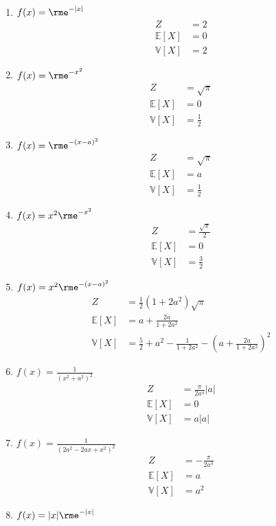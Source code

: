 \documentclass[11pt,answers]{exam}
\begin{document}
\begin{questions}
\begin{solution}
\begin{align*}
\end{align*}
\begin{enumerate}
\item $f(x)=\rme^{-|x|}$
\begin{align*}
Z&=2
\\
\mathbb{E}[X]&=0
\\
\mathbb{V}[X]&=2
\end{align*}
\item $f(x)=\rme^{-x^2}$
\begin{align*}
Z&=\sqrt{\pi}
\\
\mathbb{E}[X]&=0
\\
\mathbb{V}[X]&=\frac{1}{2}
\end{align*}
\item $f(x)=\rme^{-(x-a)^2}$
\begin{align*}
Z&=\sqrt{\pi}
\\
\mathbb{E}[X]&=a
\\
\mathbb{V}[X]&=\frac{1}{2}
\end{align*}
\item $f(x)=x^2\rme^{-x^2}$
\begin{align*}
Z&=\frac{\sqrt{\pi}}{2}
\\
\mathbb{E}[X]&=0
\\
\mathbb{V}[X]&=\frac{3}{2}
\end{align*}
\item $f(x)=x^2\rme^{-(x-a)^2}$
\begin{align*}
Z&=\frac{1}{2}\left(1+2a^2\right)\sqrt{\pi}
\\
\mathbb{E}[X]&=a+\frac{2a}{1+2a^2}
\\
\mathbb{V}[X]&=\frac{5}{2}+a^2-\frac{1}{1+2a^2}-\left(a+\frac{2a}{1+2a^2}\right)^2
\end{align*}
\item $f(x)=\frac{1}{\left(x^2+a^2\right)^2}$
\begin{align*}
Z&=\frac{\pi}{2a^4}|a|
\\
\mathbb{E}[X]&=0
\\
\mathbb{V}[X]&=a|a|
\end{align*}
\item $f(x)=\frac{1}{\left(2 a^2-2 a x+x^2\right)^2}$
\begin{align*}
Z&=-\frac{\pi}{2a^3}
\\
\mathbb{E}[X]&=a
\\
\mathbb{V}[X]&=a^2
\end{align*}
\item $f(x)=|x|\rme^{-|x|}$
\begin{align*}

\end{align*}
\end{enumerate}
\end{solution}
\end{questions}
\end{document}
